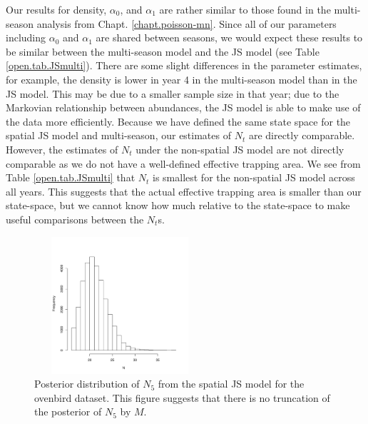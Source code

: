 Our results for density, $\alpha_0$, and $\alpha_1$ are rather similar
to those found in the multi-season analysis from
Chapt. \ref{chapt.poisson-mn}.  Since all of our parameters including
$\alpha_0$ and $\alpha_1$ are shared between seasons, we would expect
these results to be similar between the multi-season model and the JS
model (see Table \ref{open.tab.JSmulti}).  There are some slight
differences in the parameter estimates, for example, the density is
lower in year 4 in the multi-season model than in the JS model.  This
may be due to a smaller sample size in that year; due to the Markovian
relationship between abundances, the JS model is able to make use of
the data more efficiently.  Because we have defined the same state
space for the spatial JS model and multi-season, our estimates of
$N_t$ are directly comparable.  However, the estimates of $N_t$ under
the non-spatial JS model are not directly comparable as we do not have
a well-defined effective trapping area.  We see from Table
\ref{open.tab.JSmulti} that $N_t$ is smallest for the non-spatial JS
model across all years.  This suggests that the actual effective
trapping area is smaller than our state-space, but we cannot know how
much relative to the state-space to make useful comparisons between
the $N_t$s.

\begin{figure}
\centering
\includegraphics[height=2in,width=2.5in]{Ch16-Open/figs/Nhat5ovenbird.pdf}
\caption{Posterior distribution of $N_5$ from the spatial JS model for
  the ovenbird dataset.  This figure
suggests that there is no truncation of the posterior of $N_5$ by $M$. }
\label{open.figs.ovenbirdN5hist}
\end{figure}

